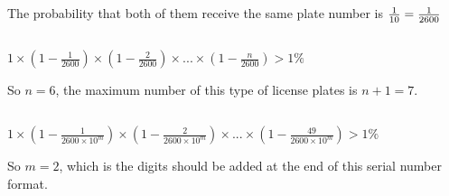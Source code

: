 \documentclass[onecolumn,oneside]{SUSTechHomework}
\begin{document}
    \subsection{}

    The probability that both of them receive the same plate number is $\frac{1}{10 \time 10 \time 26}= \frac{1}{2600}$

    \subsection{}

    $1 \times (1 - \frac{1}{2600}) \times (1 - \frac{2}{2600}) \times ... \times (1 - \frac{n}{2600}) > 1\%$

    So $n=6$, the maximum number of this type of license plates is $n+1=7$.

    \subsection{}

    $1 \times (1 - \frac{1}{2600 \times 10^m}) \times (1 - \frac{2}{2600 \times 10^m}) \times ... \times (1 - \frac{49}{2600 \times 10^m}) > 1\%$

    So $m=2$, which is the digits should be added at the end of this serial number format.
\end{document}
